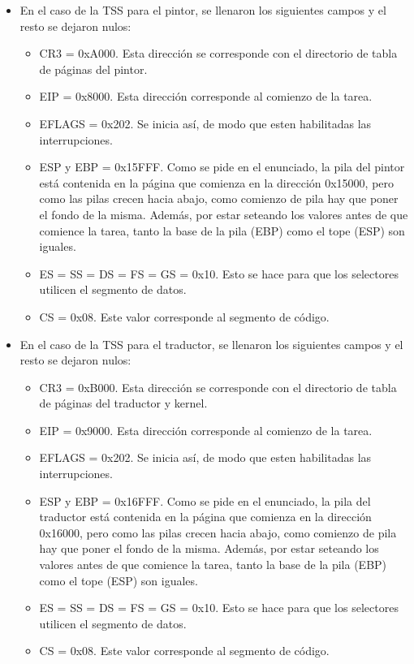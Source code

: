 \begin{itemize}
\begin{itemize}
 	\item En el caso de la TSS para el pintor, se llenaron los siguientes campos y el resto se dejaron nulos:
 		\begin{itemize}
 			\item CR3 = 0xA000. Esta direcci\'on se corresponde con el directorio de tabla de p\'aginas del pintor.
			\item EIP = 0x8000. Esta direcci\'on corresponde al comienzo de la tarea.
			\item EFLAGS = 0x202. Se inicia as\'i, de modo que esten habilitadas las interrupciones.
			\item ESP y EBP = 0x15FFF. Como se pide en el enunciado, la pila del pintor est\'a contenida en la p\'agina que comienza en la direcci\'on 0x15000, pero como las pilas crecen hacia abajo, como comienzo de pila hay que poner el fondo de la misma. Adem\'as, por estar seteando los valores antes de que comience la tarea, tanto la base de la pila (EBP) como el tope (ESP) son iguales.
			\item ES = SS = DS = FS = GS = 0x10. Esto se hace para que los selectores utilicen el segmento de datos.
			\item CS = 0x08. Este valor corresponde al segmento de c\'odigo.
		\end{itemize}
	\item En el caso de la TSS para el traductor, se llenaron los siguientes campos y el resto se dejaron nulos:
 		\begin{itemize}
 			\item CR3 = 0xB000. Esta direcci\'on se corresponde con el directorio de tabla de p\'aginas del traductor y kernel.
			\item EIP = 0x9000. Esta direcci\'on corresponde al comienzo de la tarea.
			\item EFLAGS = 0x202. Se inicia as\'i, de modo que esten habilitadas las interrupciones.
			\item ESP y EBP = 0x16FFF. Como se pide en el enunciado, la pila del traductor est\'a contenida en la p\'agina que comienza en la direcci\'on 0x16000, pero como las pilas crecen hacia abajo, como comienzo de pila hay que poner el fondo de la misma. Adem\'as, por estar seteando los valores antes de que comience la tarea, tanto la base de la pila (EBP) como el tope (ESP) son iguales.
			\item ES = SS = DS = FS = GS = 0x10. Esto se hace para que los selectores utilicen el segmento de datos.
			\item CS = 0x08. Este valor corresponde al segmento de c\'odigo.
		\end{itemize}
	\end{itemize}


\end{itemize}
